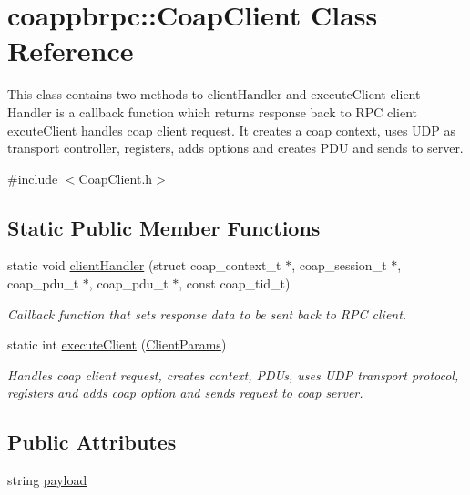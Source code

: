 \hypertarget{classcoappbrpc_1_1CoapClient}{}\section{coappbrpc\+:\+:Coap\+Client Class Reference}
\label{classcoappbrpc_1_1CoapClient}


This class contains two methods to client\+Handler and execute\+Client client Handler is a callback function which returns response back to R\+PC client excute\+Client handles coap client request. It creates a coap context, uses U\+DP as transport controller, registers, adds options and creates P\+DU and sends to server.  




{\ttfamily \#include $<$Coap\+Client.\+h$>$}

\subsection*{Static Public Member Functions}
\begin{DoxyCompactItemize}
\item 
static void \hyperlink{classcoappbrpc_1_1CoapClient_ab27b2485df1e7213425fe0f1b75110fa}{client\+Handler} (struct coap\+\_\+context\+\_\+t $\ast$, coap\+\_\+session\+\_\+t $\ast$, coap\+\_\+pdu\+\_\+t $\ast$, coap\+\_\+pdu\+\_\+t $\ast$, const coap\+\_\+tid\+\_\+t)
\begin{DoxyCompactList}\small\item\em Callback function that sets response data to be sent back to R\+PC client. \end{DoxyCompactList}\item 
static int \hyperlink{classcoappbrpc_1_1CoapClient_ac622e2dd087135defc27d8d4401a3119}{execute\+Client} (\hyperlink{structClientParams}{Client\+Params})
\begin{DoxyCompactList}\small\item\em Handles coap client request, creates context, P\+D\+Us, uses U\+DP transport protocol, registers and adds coap option and sends request to coap server. \end{DoxyCompactList}\end{DoxyCompactItemize}
\subsection*{Public Attributes}
\begin{DoxyCompactItemize}
\item 
string \hyperlink{classcoappbrpc_1_1CoapClient_ae6909f236ca1cd6b8b6343b7827ea004}{payload}
\end{DoxyCompactItemize}


